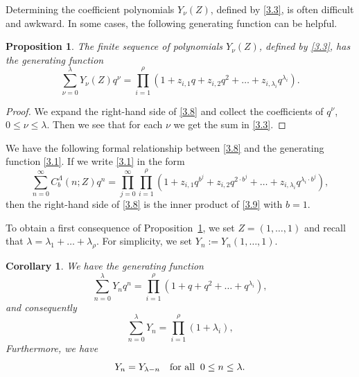 \documentclass{amsart}
\theoremstyle{plain}
\newtheorem{corollary}[theorem]{Corollary}
\newtheorem{proposition}[theorem]{Proposition}
\numberwithin{equation}{section}
\begin{document}
Determining the coefficient polynomials $Y_\nu(Z)$, defined by \eqref{3.3}, is
often difficult and awkward. In some cases, the following generating function
can be helpful.

\begin{proposition}\label{prop:3.4}
The finite sequence of polynomials $Y_\nu(Z)$, defined by \eqref{3.3}, has the
generating function
\begin{equation}\label{3.8}
\sum_{\nu=0}^\lambda Y_\nu(Z)q^\nu = \prod_{i=1}^\rho
\left(1+z_{i,1}q+z_{i,2}q^2+\dots +z_{i,\lambda_i}q^{\lambda_i}\right).
\end{equation}
\end{proposition}

\begin{proof}
We expand the right-hand side of \eqref{3.8} and collect the coefficients of
$q^\nu$, $0\leq\nu\leq\lambda$. Then we see that for each $\nu$ we get the sum
in \eqref{3.3}.
\end{proof}

We have the following formal relationship between \eqref{3.8} and the 
generating function \eqref{3.1}. If we write \eqref{3.1} in the form
\begin{equation}\label{3.9}
\sum_{n=0}^\infty C_b^\Lambda(n;Z)q^n =\prod_{j=0}^\infty\prod_{i=1}^\rho
\left(1+z_{i,1}q^{b^j}+z_{i,2}q^{2\cdot b^j}+\dots
+z_{i,\lambda_i}q^{\lambda_i\cdot b^j}\right),
\end{equation}
then the right-hand side of \eqref{3.8} is the inner product of \eqref{3.9}
with $b=1$.

To obtain a first consequence of Proposition~\ref{prop:3.4}, we set 
$Z=(1,\ldots,1)$ and recall that $\lambda=\lambda_1+\dots+\lambda_\rho$. For
simplicity, we set $Y_n:=Y_n(1,\ldots,1)$.

\begin{corollary}\label{cor:3.5}
We have the generating function
\begin{equation}\label{3.10}
\sum_{n=0}^\lambda Y_nq^n = \prod_{i=1}^\rho
\left(1+q+q^2+\dots+q^{\lambda_i}\right),
\end{equation}
and consequently
\begin{equation}\label{3.11}
\sum_{n=0}^\lambda Y_n = \prod_{i=1}^\rho\left(1+\lambda_i\right),
\end{equation}
Furthermore, we have
\begin{equation}\label{3.12}
Y_n = Y_{\lambda-n}\quad\hbox{for all}\;\;0\leq n\leq\lambda.
\end{equation}
\end{corollary}
\end{document}
